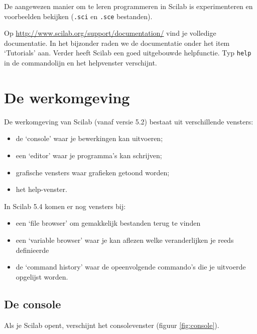 De aangewezen  manier om te leren programmeren in Scilab is experimenteren en voorbeelden bekijken (\texttt{.sci} en \texttt{.sce} bestanden).

Op \url{http://www.scilab.org/support/documentation/} vind je volledige documentatie. In het bijzonder raden we de documentatie onder het item `Tutorials' aan.  Verder heeft Scilab een goed uitgebouwde helpfunctie. Typ \verb+help+ in de commandolijn en het helpvenster verschijnt.


\section{De werkomgeving}
De werkomgeving van Scilab (vanaf versie 5.2) bestaat uit verschillende vensters:
\begin{itemize}
\item de `console' waar je bewerkingen kan uitvoeren;
\item een `editor' waar je programma's kan schrijven;
\item grafische vensters waar grafieken getoond worden;
\item het help-venster.
\end{itemize}
In Scilab 5.4 komen er nog vensters bij:
\begin{itemize}
\item een `file browser' om gemakkelijk bestanden terug te vinden
\item een `variable browser' waar je kan aflezen welke veranderlijken je reeds definieerde
\item de `command history' waar de opeenvolgende commando's die je uitvoerde opgelijst worden.
\end{itemize}


\subsection{De console}
Als je Scilab opent, verschijnt het consolevenster (figuur \ref{fig:console}).

